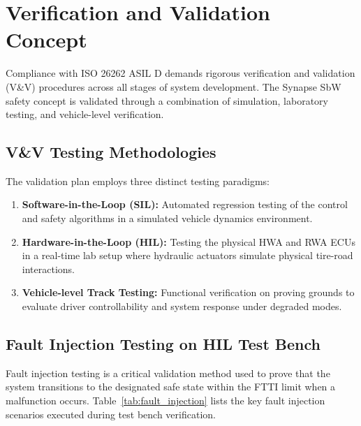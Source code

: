 \section{Verification and Validation Concept}
\label{sec:validation}

Compliance with ISO 26262 ASIL D demands rigorous verification and validation (V\&V) procedures across all stages of system development. The Synapse SbW safety concept is validated through a combination of simulation, laboratory testing, and vehicle-level verification.

\subsection{V\&V Testing Methodologies}
The validation plan employs three distinct testing paradigms:
\begin{enumerate}
    \item \textbf{Software-in-the-Loop (SIL):} Automated regression testing of the control and safety algorithms in a simulated vehicle dynamics environment.
    \item \textbf{Hardware-in-the-Loop (HIL):} Testing the physical HWA and RWA ECUs in a real-time lab setup where hydraulic actuators simulate physical tire-road interactions.
    \item \textbf{Vehicle-level Track Testing:} Functional verification on proving grounds to evaluate driver controllability and system response under degraded modes.
\end{enumerate}

\subsection{Fault Injection Testing on HIL Test Bench}
Fault injection testing is a critical validation method used to prove that the system transitions to the designated safe state within the FTTI limit when a malfunction occurs. Table~\ref{tab:fault_injection} lists the key fault injection scenarios executed during test bench verification.

